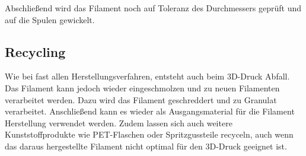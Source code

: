 \documentclass[10pt]{article}
\begin{document}
    \newpage
    Abschließend wird das Filament noch auf Toleranz des Durchmessers geprüft und auf die Spulen gewickelt.

    \begin{figure}[H]
        \centering
        \qquad
    \end{figure}


    \subsection{Recycling}
    Wie bei fast allen Herstellungsverfahren, entsteht auch beim 3D-Druck Abfall.
    Das Filament kann jedoch wieder eingeschmolzen und zu neuen Filamenten verarbeitet werden.
    Dazu wird das Filament geschreddert und zu Granulat verarbeitet.
    Anschließend kann es wieder als Ausgangsmaterial für die Filament Herstellung verwendet werden.
    Zudem lassen sich auch weitere Kunststoffprodukte wie PET-Flaschen oder Spritzgussteile recyceln, auch wenn das daraus hergestellte Filament nicht optimal für den 3D-Druck geeignet ist.
\end{document}
